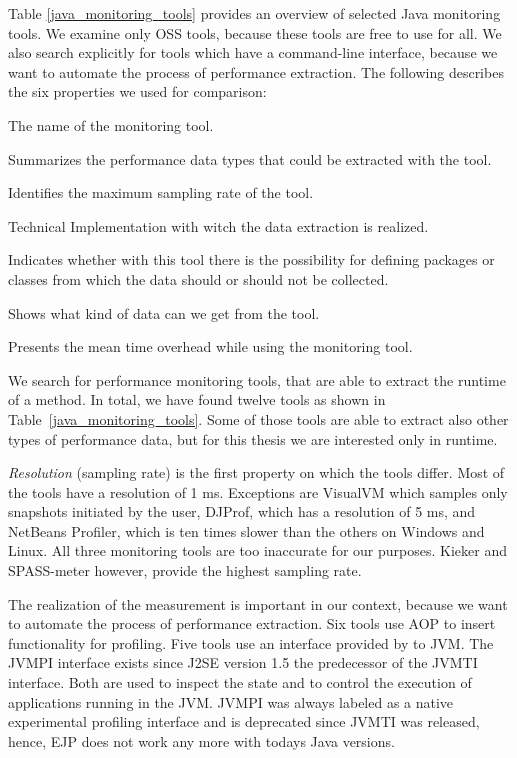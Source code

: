 Table \ref{java_monitoring_tools} provides an overview of selected Java monitoring tools. We examine only \ac{OSS} tools, because these tools are free to use for all. We also search explicitly for tools which have a command-line interface, because we want to automate the process of performance extraction. The following describes the six properties we used for comparison:
\begin{description}[style=multiline,leftmargin=8em]
	\item [Tool] The name of the monitoring tool.
	\item [Performance Type] Summarizes the performance data types that could be extracted with the tool.
	\item [Resolution] Identifies the maximum sampling rate of the tool.
	\item [Realization] Technical Implementation with witch the data extraction is realized.
	\item [Filter] Indicates whether with this tool there is the possibility for defining packages or classes from which the data should or should not be collected.
	\item [Output] Shows what kind of data can we get from the tool.
    \item [Overhead Factor] Presents the mean time overhead while using the monitoring tool.
\end{description}


We search for performance monitoring tools, that are able to extract the runtime of a method. In total, we have found twelve tools as shown in Table~\ref{java_monitoring_tools}. Some of those tools are able to extract also other types of performance data, but for this thesis we are interested only in runtime. 

\textit{Resolution} (sampling rate) is the first property on which the tools differ. Most of the tools have a resolution of 1 ms. Exceptions are VisualVM which samples only snapshots initiated by the user, DJProf, which has a resolution of 5 ms, and NetBeans Profiler, which is ten times slower than the others on Windows and Linux. All three monitoring tools are too inaccurate for our purposes. Kieker and SPASS-meter however, provide the highest sampling rate. 

The realization of the measurement is important in our context, because we want to automate the process of performance extraction. Six tools use \ac{AOP} to insert functionality for profiling. Five tools use an interface provided by to \ac{JVM}. The JVMPI interface exists since J2SE version 1.5 the predecessor of the JVMTI interface. Both are used to inspect the state and to control the execution of applications running in the \ac{JVM}. JVMPI was always labeled as a native experimental profiling interface and is deprecated since JVMTI was released, hence, EJP does not work any more with todays Java versions.

